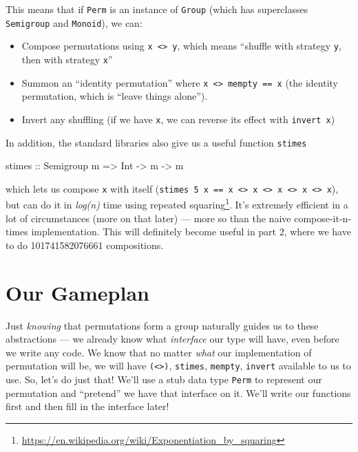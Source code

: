 \documentclass[]{article}
\newenvironment{Shaded}{}{}
\newcommand{\DataTypeTok}[1]{\textcolor[rgb]{0.56,0.13,0.00}{#1}}
\newcommand{\NormalTok}[1]{#1}
\newcommand{\OtherTok}[1]{\textcolor[rgb]{0.00,0.44,0.13}{#1}}
\renewcommand{\href}[2]{#2\footnote{\url{#1}}}
\begin{document}
This means that if \texttt{Perm} is an instance of \texttt{Group} (which has
superclasses \texttt{Semigroup} and \texttt{Monoid}), we can:

\begin{itemize}
\tightlist
\item
  Compose permutations using \texttt{x\ \textless{}\textgreater{}\ y}, which
  means ``shuffle with strategy \texttt{y}, then with strategy \texttt{x}''
\item
  Summon an ``identity permutation'' where
  \texttt{x\ \textless{}\textgreater{}\ mempty\ ==\ x} (the identity
  permutation, which is ``leave things alone'').
\item
  Invert any shuffling (if we have \texttt{x}, we can reverse its effect with
  \texttt{invert\ x})
\end{itemize}

In addition, the standard libraries also give us a useful function
\texttt{stimes}

\begin{Shaded}
\begin{Highlighting}[]
\OtherTok{stimes ::} \DataTypeTok{Semigroup}\NormalTok{ m }\OtherTok{=>} \DataTypeTok{Int} \OtherTok{{-}>}\NormalTok{ m }\OtherTok{{-}>}\NormalTok{ m}
\end{Highlighting}
\end{Shaded}

which lets us compose \texttt{x} with itself
(\texttt{stimes\ 5\ x\ ==\ x\ \textless{}\textgreater{}\ x\ \textless{}\textgreater{}\ x\ \textless{}\textgreater{}\ x\ \textless{}\textgreater{}\ x}),
but can do it in \emph{log(n)} time using
\href{https://en.wikipedia.org/wiki/Exponentiation_by_squaring}{repeated
squaring}. It's extremely efficient in a lot of circumstances (more on that
later) --- more so than the naive compose-it-n-times implementation. This will
definitely become useful in part 2, where we have to do 101741582076661
compositions.

\hypertarget{our-gameplan}{%
\section{Our Gameplan}\label{our-gameplan}}

Just \emph{knowing} that permutations form a group naturally guides us to these
abstractions --- we already know what \emph{interface} our type will have, even
before we write any code. We know that no matter \emph{what} our implementation
of permutation will be, we will have \texttt{(\textless{}\textgreater{})},
\texttt{stimes}, \texttt{mempty}, \texttt{invert} available to us to use. So,
let's do just that! We'll use a stub data type \texttt{Perm} to represent our
permutation and ``pretend'' we have that interface on it. We'll write our
functions first and then fill in the interface later!
\end{document}

